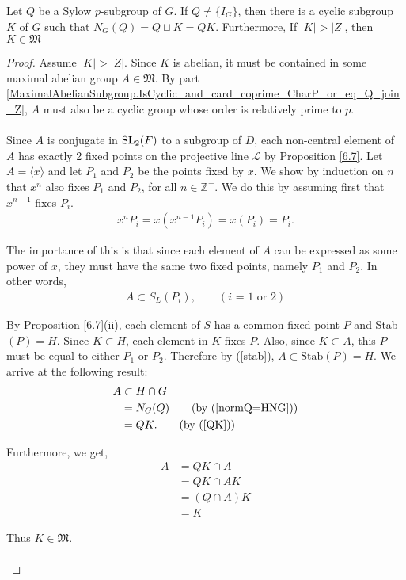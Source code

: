 \begin{theorem}
  \label{MaximalAbelianSubgroup.K_mem_MaximalAbelianSubgroups_of_center_lt_card_K}
  Let $Q$ be a Sylow $p$-subgroup of $G$. If $Q \neq \{I_G\}$, then there is a cyclic subgroup $K$ of $G$ such that $N_G(Q) = Q \sqcup K = QK$. Furthermore, If $|K| > |Z|$, then $K \in \mathfrak{M}$
\end{theorem}
\begin{proof} 
Assume $|K| > |Z|$. Since $K$ is abelian, it must be contained in some maximal abelian group $A \in \mathfrak{M}$. By part \ref{MaximalAbelianSubgroup.IsCyclic_and_card_coprime_CharP_or_eq_Q_join_Z}, $A$ must also be a cyclic group whose order is relatively prime to $p$. \\
\\
Since $A$ is conjugate in $\operatorname{SL}_2(F)$ to a subgroup of $D$, each non-central element of $A$ has exactly 2 fixed points on the projective line $\mathscr{L}$ by Proposition \ref{6.7}. Let $A = \langle x \rangle$ and let $P_1$ and $P_2$ be the points fixed by $x$. We show by induction on $n$ that $x^n$ also fixes $P_1$ and $P_2$, for all $n \in \mathbb{Z^+}$. We do this by assuming first that $x^{n-1}$ fixes $P_i$.
\begin{align*} x^n P_i = x(x^{n-1} P_i) = x (P_i) = P_i.
\end{align*}

The importance of this is that since each element of $A$ can be expressed as some power of $x$, they must have the same two fixed points, namely $P_1$ and $P_2$. In other words, 
\begin{align}\label{stab} A \subset S_L(P_i), \qquad (\text{$i$ = 1 or 2})
\end{align}

By Proposition \ref{6.7}(ii), each element of $S$ has a common fixed point $P$ and Stab$(P) = H$. Since $K \subset H$, each element in $K$ fixes $P$. Also, since $K \subset A$, this $P$ must be equal to either $P_1$ or $P_2$. Therefore by (\ref{stab}), $A \subset \text{Stab}(P) = H$. We arrive at the following result:
\begin{align*} A &\subset H \cap G 
\\ &= N_G(Q) \tag{by (\ref{normQ=HNG})}
\\ &= QK. \tag{by (\ref{QK})}
\end{align*}

Furthermore, we get,
\begin{align*} A &= QK \cap A
\\ &= QK \cap AK \tag{$K \subset A$ so $A = AK$}
\\ &= (Q \cap A)K
\\ &= K \tag{$Q \cap A = I_G$}
\end{align*}

Thus $K \in \mathfrak{M}$.\\
\\
\end{proof}

